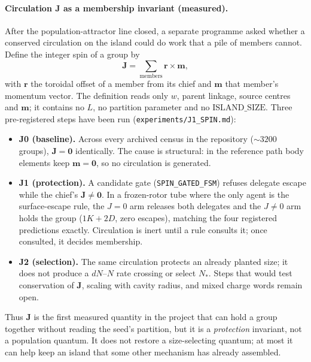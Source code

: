 \documentclass{ijuc}
\begin{document}
\paragraph{Circulation $\mathbf{J}$ as a membership invariant (measured).}
After the population-attractor line closed, a separate programme asked whether a conserved circulation on the island could do work that a pile of members cannot. Define the integer spin of a group by
\[
\mathbf{J}=\sum_{\mathrm{members}}\mathbf{r}\times\mathbf{m},
\]
with \(\mathbf{r}\) the toroidal offset of a member from its chief and \(\mathbf{m}\) that member's momentum vector. The definition reads only \(w\), parent linkage, source centres and \(\boldsymbol{m}\); it contains no \(L\), no partition parameter and no \(\mathrm{ISLAND\_SIZE}\). Three pre-registered steps have been run (\texttt{experiments/J1\_SPIN.md}):
\begin{itemize}
\item \textbf{J0 (baseline).} Across every archived census in the repository (\(\sim 3200\) groups), \(\mathbf{J}=\mathbf{0}\) identically. The cause is structural: in the reference path body elements keep \(\boldsymbol{m}=\mathbf{0}\), so no circulation is generated.
\item \textbf{J1 (protection).} A candidate gate (\texttt{SPIN\_GATED\_FSM}) refuses delegate escape while the chief's \(\mathbf{J}\neq\mathbf{0}\). In a frozen-rotor tube where the only agent is the surface-escape rule, the \(J=0\) arm releases both delegates and the \(J\neq 0\) arm holds the group (\(1K+2D\), zero escapes), matching the four registered predictions exactly. Circulation is inert until a rule consults it; once consulted, it decides membership.
\item \textbf{J2 (selection).} The same circulation protects an already planted size; it does not produce a \(dN\)--\(N\) rate crossing or select \(N_*\). Steps that would test conservation of \(\mathbf{J}\), scaling with cavity radius, and mixed charge words remain open.
\end{itemize}
Thus \(\mathbf{J}\) is the first measured quantity in the project that can hold a group together without reading the seed's partition, but it is a \emph{protection} invariant, not a population quantum. It does not restore a size-selecting quantum; at most it can help keep an island that some other mechanism has already assembled.
\end{document}
